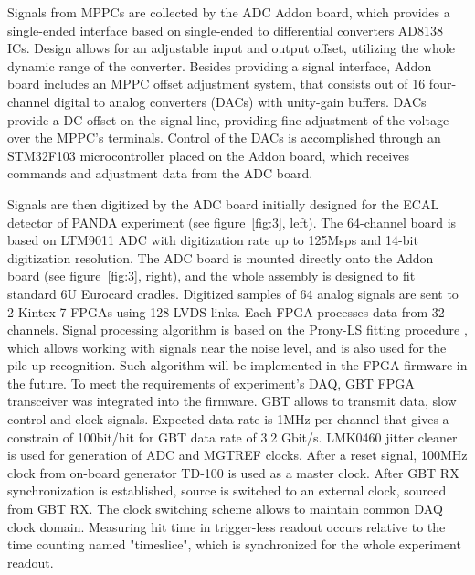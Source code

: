 \documentclass[a4paper,11pt]{article}
\begin{document}
Signals from MPPCs are collected by the ADC Addon board, which provides a single-ended interface based on single-ended to differential converters AD8138 ICs. Design allows for an adjustable input and output offset, utilizing the whole dynamic range of the converter. Besides providing a signal interface, Addon board includes an MPPC offset adjustment system, that consists out of 16 four-channel digital to analog converters (DACs) with unity-gain buffers. DACs provide a DC offset on the signal line, providing fine adjustment of the voltage over the MPPC's terminals. Control of the DACs is accomplished through an STM32F103 microcontroller placed on the Addon board, which receives commands and adjustment data from the ADC board.

Signals are then digitized by the ADC board initially designed for the ECAL detector of PANDA experiment \cite{4} (see figure~\ref{fig:3}, left). The 64-channel board is based on LTM9011 ADC with digitization rate up to 125Msps and 14-bit digitization resolution. The ADC board is mounted directly onto the Addon board (see figure~\ref{fig:3}, right), and the whole assembly is designed to fit standard 6U Eurocard cradles.
Digitized samples of 64 analog signals are sent to 2 Kintex 7 FPGAs using 128 LVDS links. Each FPGA processes data from 32 channels. Signal processing algorithm is based on the Prony-LS fitting procedure \cite{5}, which allows working with signals near the noise level, and is also used for the pile-up recognition. Such algorithm will be implemented in the FPGA firmware in the future.
To meet the requirements of experiment's DAQ, GBT FPGA transceiver was integrated into the firmware. GBT allows to transmit data, slow control and clock signals. Expected data rate is 1MHz per channel that gives a constrain of 100bit/hit for GBT data rate of 3.2 Gbit/s. 
LMK0460 jitter cleaner is used for generation of ADC and MGTREF clocks. After a reset signal, 100MHz clock from on-board generator TD-100 is used as a master clock. After GBT RX synchronization is established, source is switched to an external clock, sourced from GBT RX. The clock switching scheme allows to maintain common DAQ clock domain. Measuring hit time in trigger-less readout occurs relative to the time counting named "timeslice", which is synchronized for the whole experiment readout.
\end{document}
